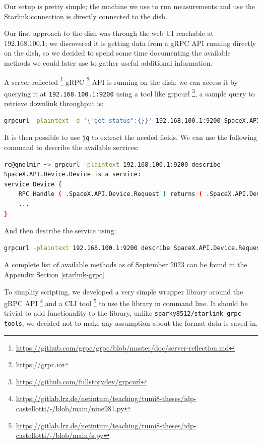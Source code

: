 \documentclass[IN,11pt,twoside,openright,idp,english]{tumthesis}
\begin{document}
Our setup is pretty simple; the machine we use to run measurements and use the Starlink connection is directly connected to the dish.

Our first approach to the dish was through the web UI reachable at 192.168.100.1; we discovered it is getting data from a gRPC API running directly on the dish, so we decided to spend some time documenting the available methods we could later use to gather useful additional information.

A server-reflected \footnote{\url{https://github.com/grpc/grpc/blob/master/doc/server-reflection.md}} gRPC
\footnote{\url{https://grpc.io}} API is running on the dish; we can access it by querying it at \texttt{192.168.100.1:9200} using a tool like grpcurl \footnote{\url{https://github.com/fullstorydev/grpcurl}}, a sample query to retrieve downlink throughput is:

\begin{lstlisting}[language=bash,basicstyle=\tiny]
grpcurl -plaintext -d '{"get_status":{}}' 192.168.100.1:9200 SpaceX.API.Device.Device/Handle
\end{lstlisting}

It is then possible to use \texttt{jq} to extract the needed fields. We can use the following command to describe the available services:

\begin{lstlisting}[language=bash,basicstyle=\tiny]
rc@gnolmir ~> grpcurl -plaintext 192.168.100.1:9200 describe
SpaceX.API.Device.Device is a service:
service Device {
	RPC Handle ( .SpaceX.API.Device.Request ) returns ( .SpaceX.API.Device.Response );
	...
}
\end{lstlisting}

And then describe the service using:

\begin{lstlisting}[language=bash,basicstyle=\tiny]
grpcurl -plaintext 192.168.100.1:9200 describe SpaceX.API.Device.Request
\end{lstlisting}

A complete list of available methods as of September 2023 can be found in the Appendix Section \ref{starlink-grpc}

To simplify scripting, we developed a very simple wrapper library around the gRPC API  \footnote{\url{https://gitlab.lrz.de/netintum/teaching/tumi8-theses/idp-castellotti/-/blob/main/nine981.py}} and a CLI tool \footnote{\url{https://gitlab.lrz.de/netintum/teaching/tumi8-theses/idp-castellotti/-/blob/main/s.py}} to use the library in command line. It should be trivial to add functionality to the library, unlike \texttt{sparky8512/starlink-grpc-tools}, we decided not to make any assumption about the format data is saved in.
\end{document}
